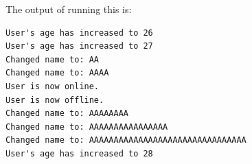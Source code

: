 \documentclass{article}
\begin{document}
	    		The output of running this is:

	    		\begin{lstlisting}
User's age has increased to 26
User's age has increased to 27
Changed name to: AA
Changed name to: AAAA
User is now online.
User is now offline.
Changed name to: AAAAAAAA
Changed name to: AAAAAAAAAAAAAAAA
Changed name to: AAAAAAAAAAAAAAAAAAAAAAAAAAAAAAAA
User's age has increased to 28
	    		\end{lstlisting}
\end{document}
